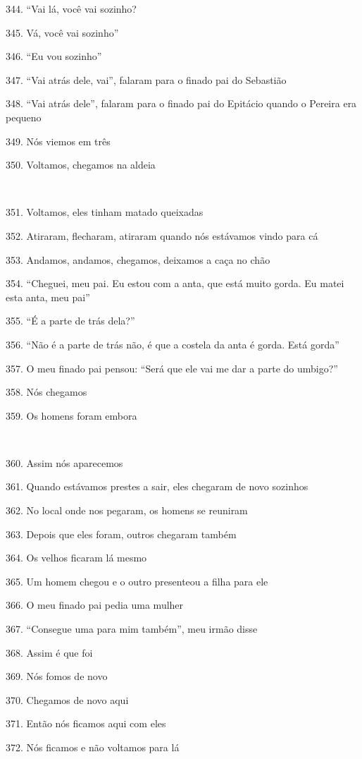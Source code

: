 344. ``Vai lá, você vai sozinho?

345. Vá, você vai sozinho''

346. ``Eu vou sozinho''

347. ``Vai atrás dele, vai'', falaram para o finado pai do Sebastião

348. ``Vai atrás dele'', falaram para o finado pai do Epitácio quando o
Pereira era pequeno

349. Nós viemos em três

350. Voltamos, chegamos na aldeia

~

351. Voltamos, eles tinham matado queixadas

352. Atiraram, flecharam, atiraram quando nós estávamos vindo para cá

353. Andamos, andamos, chegamos, deixamos a caça no chão

354. ``Cheguei, meu pai. Eu estou com a anta, que está muito gorda. Eu matei esta anta, meu pai''

355. ``É a parte de trás dela?''

356. ``Não é a parte de trás não, é que a costela da anta é gorda. Está gorda''

357. O meu finado pai pensou: ``Será que ele vai me dar a parte do umbigo?''

358. Nós chegamos

359. Os homens foram embora

~

360. Assim nós aparecemos

361. Quando estávamos prestes a sair, eles chegaram de novo sozinhos

362. No local onde nos pegaram, os homens se reuniram

363. Depois que eles foram, outros chegaram também

364. Os velhos ficaram lá mesmo

365. Um homem chegou e o outro presenteou a filha para ele

366. O meu finado pai pedia uma mulher

367. ``Consegue uma para mim também'', meu irmão disse

368. Assim é que foi

369. Nós fomos de novo

370. Chegamos de novo aqui

371. Então nós ficamos aqui com eles

372. Nós ficamos e não voltamos para lá

